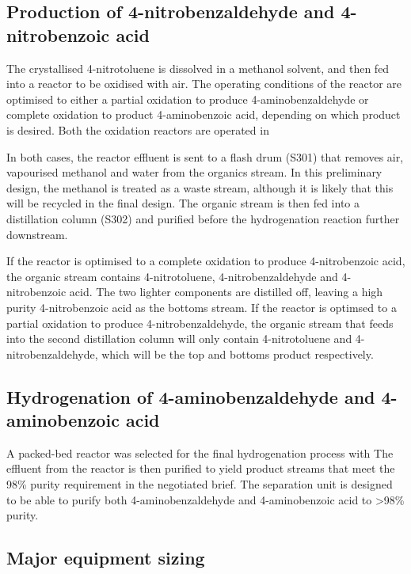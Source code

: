 \subsection{Production of 4-nitrobenzaldehyde and 4-nitrobenzoic acid}
The crystallised 4-nitrotoluene is dissolved in a methanol solvent, and then fed into a reactor to be oxidised with air. The operating conditions of the reactor are optimised to either a partial oxidation to produce 4-aminobenzaldehyde or complete oxidation to product 4-aminobenzoic acid, depending on which product is desired. Both the oxidation reactors are operated in  

In both cases, the reactor effluent is sent to a flash drum (S301) that removes air, vapourised methanol and water from the organics stream. In this preliminary design, the methanol is treated as a waste stream, although it is likely that this will be recycled in the final design. The organic stream is then fed into a distillation column (S302) and purified before the hydrogenation reaction further downstream.

If the reactor is optimised to a complete oxidation to produce 4-nitrobenzoic acid, the organic stream contains 4-nitrotoluene, 4-nitrobenzaldehyde and 4-nitrobenzoic acid. The two lighter components are distilled off, leaving a high purity 4-nitrobenzoic acid as the bottoms stream. If the reactor is optimsed to a partial oxidation to produce 4-nitrobenzaldehyde, the organic stream that feeds into the second distillation column will only contain 4-nitrotoluene and 4-nitrobenzaldehyde, which will be the top and bottoms product respectively. 

\subsection{Hydrogenation of 4-aminobenzaldehyde and 4-aminobenzoic acid}

A packed-bed reactor was selected for the final hydrogenation process with 
The effluent from the reactor is then purified to yield product streams that meet the 98\% purity requirement in the negotiated brief. The separation unit is designed to be able to purify both 4-aminobenzaldehyde and 4-aminobenzoic acid to >98\% purity.

\subsection{Major equipment sizing}


